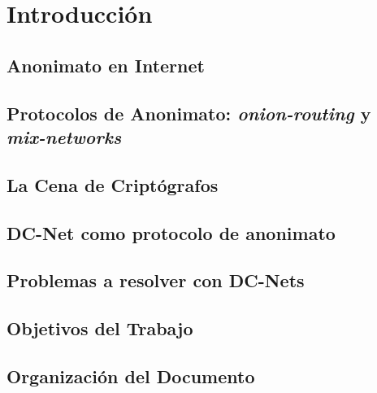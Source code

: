 \chapter{Introducción}
\section{Anonimato en Internet}
\section{Protocolos de Anonimato: \emph{onion-routing} y \emph{mix-networks}}
\section{La Cena de Criptógrafos}
\section{DC-Net como protocolo de anonimato}
\section{Problemas a resolver con DC-Nets}
\section{Objetivos del Trabajo}
\section{Organización del Documento}